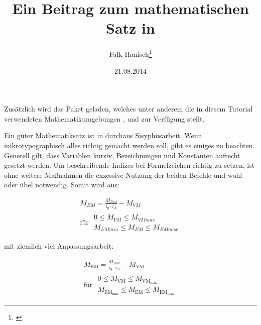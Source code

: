 \documentclass[english,ngerman]{tudscrartcl}
\begin{document}
\title{Ein Beitrag zum mathematischen Satz in }
\author{Falk Hanisch\thanks{\noexpand\href{mailto:\tudscrmail}{\tudscrmail}}}
\date{21.08.2014}
\makeatletter
\begingroup%
  \def\and{, }%
  \let\thanks\@gobble%
  \let\footnote\@gobble%
\endgroup%
\markright{\@title}
\makeatother
\StartTutorial
%
%
Zusätzlich wird das Paket  geladen, welches unter anderem die 
in diesem Tutorial verwendeten Mathematikumgebungen , 
 und  zur Verfügung stellt.
%
\begin{Preamble}
\usepackage{amsmath}
\end{Preamble}
%
Ein guter Mathematiksatz ist in  durchaus Sisyphusarbeit. Wenn 
mikrotypographisch alles richtig gemacht werden soll, gibt es einiges zu 
beachten. Generell gilt, dass Variablen kursiv, Bezeichnungen und Konstanten
aufrecht gesetzt werden. Um beschreibende Indizes bei Formelzeichen richtig zu 
setzen, ist ohne weitere Maßnahmen die exzessive Nutzung der beiden Befehle 
\PParameter{\dots} und \PParameter{\dots} wohl oder 
übel notwendig. Somit wird aus:
%
\begin{Trunk*}
\begin{equation*}
\begin{gathered}
M_{EM} =  - M_{VM} \\
\textrm{für }
\begin{aligned}
0\leq M_{VM}\leq M_{VMmax} \\ 
M_{EMmin}\leq M_{EM}\leq M_{EMmax}
\end{aligned}
\end{gathered}
\end{equation*}

\end{Trunk*}
%
mit ziemlich viel Anpassungsarbeit:
%
\begin{Trunk*}
\begin{equation*}
\begin{gathered}
M_ =  - M_ \\
\textrm{für }
\begin{aligned}
0\leq M_\leq M_ \\ 
M_\leq M_\leq M_
\end{aligned}
\end{gathered}
\end{equation*}

\end{Trunk*}
\end{document}
